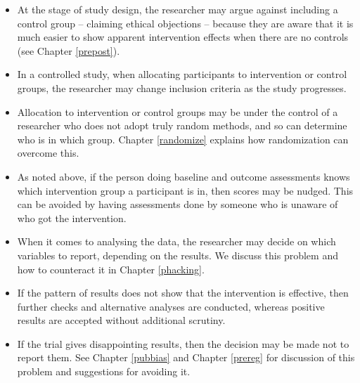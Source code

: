 \documentclass{krantz}
\providecommand{\tightlist}{%
\setlength{\itemsep}{0pt}\setlength{\parskip}{0pt}}
\begin{document}
\begin{itemize}
\tightlist
\item
  At the stage of study design, the researcher may argue against including a control group -- claiming ethical objections -- because they are aware that it is much easier to show apparent intervention effects when there are no controls (see Chapter \ref{prepost}).
\item
  In a controlled study, when allocating participants to intervention or control groups, the researcher may change inclusion criteria as the study progresses.
\item
  Allocation to intervention or control groups may be under the control of a researcher who does not adopt truly random methods, and so can determine who is in which group. Chapter \ref{randomize} explains how randomization can overcome this.
\item
  As noted above, if the person doing baseline and outcome assessments knows which intervention group a participant is in, then scores may be nudged. This can be avoided by having assessments done by someone who is unaware of who got the intervention.
\item
  When it comes to analysing the data, the researcher may decide on which variables to report, depending on the results. We discuss this problem and how to counteract it in Chapter \ref{phacking}.
\item
  If the pattern of results does not show that the intervention is effective, then further checks and alternative analyses are conducted, whereas positive results are accepted without additional scrutiny.
\item
  If the trial gives disappointing results, then the decision may be made not to report them. See Chapter \ref{pubbias} and Chapter \ref{prereg} for discussion of this problem and suggestions for avoiding it.
\end{itemize}
\end{document}
